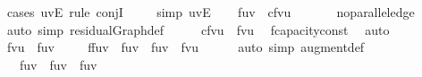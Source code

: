 \begin{isabellebody}
{%
\isadelimproof
%
\endisadelimproof
%
\isatagproof
{}\isamarkupfalse%
\ {\isacharparenleft}cases\ {\isachardoublequoteopen}{\isacharparenleft}u{\isacharcomma}v{\isacharparenright}{\isasymin}E{\isachardoublequoteclose}{\isacharsemicolon}\ rule\ conjI{\isacharparenright}\ \isanewline
\ \ \isamarkupfalse%
\ {\isacharbrackleft}simp{\isacharbrackright}{\isacharcolon}\ {\isachardoublequoteopen}{\isacharparenleft}u{\isacharcomma}v{\isacharparenright}{\isasymin}E{\isachardoublequoteclose}\isanewline
\ \ \isamarkupfalse%
\ {\isachardoublequoteopen}f{\isacharparenleft}u{\isacharcomma}v{\isacharparenright}\ {\isacharequal}\ cf{\isacharparenleft}v{\isacharcomma}u{\isacharparenright}{\isachardoublequoteclose}\ \isanewline
\ \ \ \ \isamarkupfalse%
\ no{\isacharunderscore}parallel{\isacharunderscore}edge\ \isamarkupfalse%
\ {\isacharparenleft}auto\ simp{\isacharcolon}\ residualGraph{\isacharunderscore}def{\isacharparenright}\isanewline
\ \ \isamarkupfalse%
\ \isamarkupfalse%
\ {\isachardoublequoteopen}cf{\isacharparenleft}v{\isacharcomma}u{\isacharparenright}\ {\isasymge}\ f{\isacharprime}{\isacharparenleft}v{\isacharcomma}u{\isacharparenright}{\isachardoublequoteclose}\ \isamarkupfalse%
\ f{\isacharprime}{\isachardot}capacity{\isacharunderscore}const\ \isamarkupfalse%
\ auto\isanewline
\ \ \isamarkupfalse%
\ \isamarkupfalse%
\ {\isachardoublequoteopen}f{\isacharprime}{\isacharparenleft}v{\isacharcomma}u{\isacharparenright}\ {\isasymle}\ f{\isacharparenleft}u{\isacharcomma}v{\isacharparenright}{\isachardoublequoteclose}\ \isacommand{{\isachardot}}\isamarkupfalse%
\isanewline
%
\isanewline
%
\ \
\isamarkupfalse%
\ {\isachardoublequoteopen}{\isacharparenleft}f{\isasymup}f{\isacharprime}{\isacharparenright}{\isacharparenleft}u{\isacharcomma}v{\isacharparenright}\ {\isacharequal}\ f{\isacharparenleft}u{\isacharcomma}v{\isacharparenright}\ {\isacharplus}\ f{\isacharprime}{\isacharparenleft}u{\isacharcomma}v{\isacharparenright}\ {\isacharminus}\ f{\isacharprime}{\isacharparenleft}v{\isacharcomma}u{\isacharparenright}{\isachardoublequoteclose}\isanewline
\ \ \ \ \isacommand{by}\isamarkupfalse%
\ {\isacharparenleft}auto\ simp{\isacharcolon}\ augment{\isacharunderscore}def{\isacharparenright}\isanewline
\ \ \isacommand{also}\isamarkupfalse%
\ \isamarkupfalse%
\ {\isachardoublequoteopen}{\isasymdots}\ {\isasymge}\ f{\isacharparenleft}u{\isacharcomma}v{\isacharparenright}\ {\isacharplus}\ f{\isacharprime}{\isacharparenleft}u{\isacharcomma}v{\isacharparenright}\ {\isacharminus}\ f{\isacharparenleft}u{\isacharcomma}v{\isacharparenright}{\isachardoublequoteclose}\isanewline
}
\end{isabellebody}

